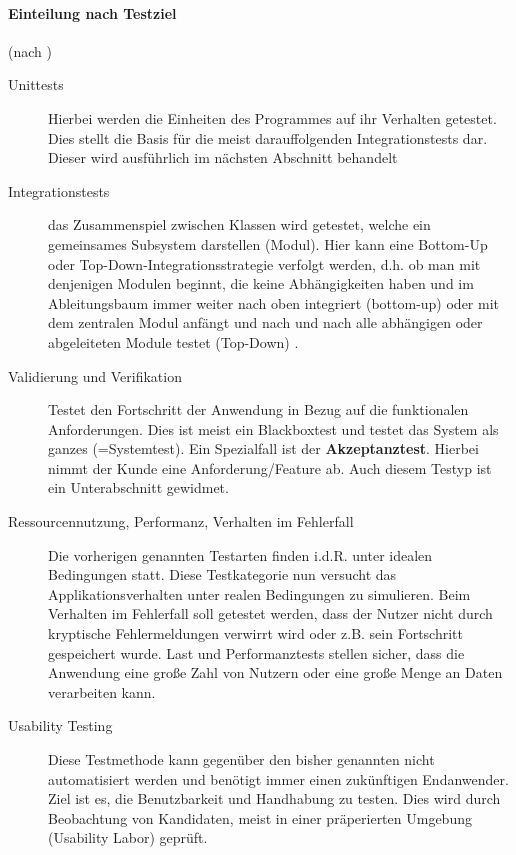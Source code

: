 \paragraph{Einteilung nach Testziel} (nach \citep[S. 238ff]{hunt_pragmatic_1999})
\begin{description}
 \item[Unittests] Hierbei werden die Einheiten des Programmes auf ihr Verhalten getestet. Dies stellt die Basis für die meist darauffolgenden Integrationstests dar. Dieser wird ausführlich im nächsten Abschnitt behandelt
 \item[Integrationstests]  das Zusammenspiel zwischen Klassen wird getestet, welche ein gemeinsames Subsystem darstellen (Modul). Hier kann eine Bottom-Up oder Top-Down\hyp{}Integrationsstrategie verfolgt werden, d.h. ob man mit denjenigen Modulen beginnt, die keine Abhängigkeiten haben und im Ableitungsbaum immer weiter nach oben integriert (bottom-up) oder mit dem zentralen Modul anfängt und nach und nach alle abhängigen oder abgeleiteten Module testet (Top-Down) \citep{liggesmeyer_modultest_1990}.
 \item[Validierung und Verifikation] Testet den Fortschritt der Anwendung in Bezug auf die funktionalen Anforderungen. Dies ist meist ein Blackboxtest und testet das System als ganzes (=Systemtest). Ein Spezialfall ist der \textbf{Akzeptanztest}. Hierbei nimmt der Kunde eine Anforderung/Feature ab. Auch diesem Testyp ist ein Unterabschnitt gewidmet.
 \item[Ressourcennutzung, Performanz, Verhalten im Fehlerfall] Die vorherigen genannten Testarten finden i.d.R. unter idealen Bedingungen statt. Diese Testkategorie nun versucht das Applikationsverhalten unter realen Bedingungen zu simulieren. Beim Verhalten im Fehlerfall soll getestet werden, dass der Nutzer nicht durch kryptische Fehlermeldungen verwirrt wird oder z.B. sein Fortschritt gespeichert wurde. Last und Performanztests stellen sicher, dass die Anwendung eine große Zahl von Nutzern oder eine große Menge an Daten verarbeiten kann.
 \item[Usability Testing] Diese Testmethode kann gegenüber den bisher genannten nicht automatisiert werden und benötigt immer einen zukünftigen Endanwender. Ziel ist es, die Benutzbarkeit und Handhabung zu testen. Dies wird durch Beobachtung von Kandidaten, meist in einer präperierten Umgebung (Usability Labor) geprüft.
\end{description}

